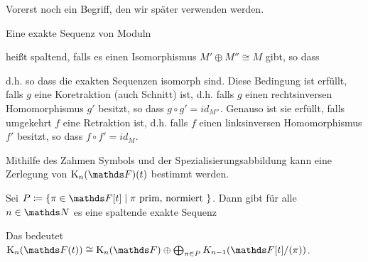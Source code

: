 \documentclass[ngerman,fontsize=11pt, paper=a4, parskip=half, titlepage=true, toc=bib]{scrartcl}
\begin{document}
Vorerst noch ein Begriff, den wir später verwenden werden.
\begin{Def}\label{spaltendeexaktesequenz}
  Eine exakte Sequenz von Moduln
  \begin{center}
 \end{center}
 heißt spaltend, falls es einen Isomorphismus $M'\oplus M''\cong M$
 gibt, so dass
 \begin{center}
 \end{center}
 d.h. so dass die exakten Sequenzen isomorph sind.
 Diese Bedingung ist erfüllt, falls $g$ eine
 Koretraktion (auch Schnitt) ist, 
 d.h. falls $g$ einen rechtsinversen Homomorphismus
 $g'$ besitzt, so dass $g\circ g'=id_{M''}$.
 Genauso ist sie erfüllt, falls umgekehrt $f$ eine Retraktion ist,
 d.h. falls $f$ einen linksinversen Homomorphismus 
 $f'$ besitzt, so dass $f\circ f'=id_{M}$.
\end{Def}

Mithilfe des Zahmen Symbols und der Spezialisierungsabbildung kann
eine Zerlegung von $\KnF(t)$ bestimmt werden.

\begin{Satz}[Milnor]\label{milnorfolge}
  Sei $P\coloneqq \{\pi\in \F[t]\mid \pi\text{ prim, normiert }\}$.
  Dann gibt für alle $n\in\N$ es eine spaltende exakte Sequenz
  \begin{center}
  \end{center}
 Das bedeutet
  $\K_n(\Ft )\cong\KnF\oplus\bigoplus_{\pi\in P}K_{n-1}(\F[t]/(\pi))$.
\end{Satz}
\end{document}
